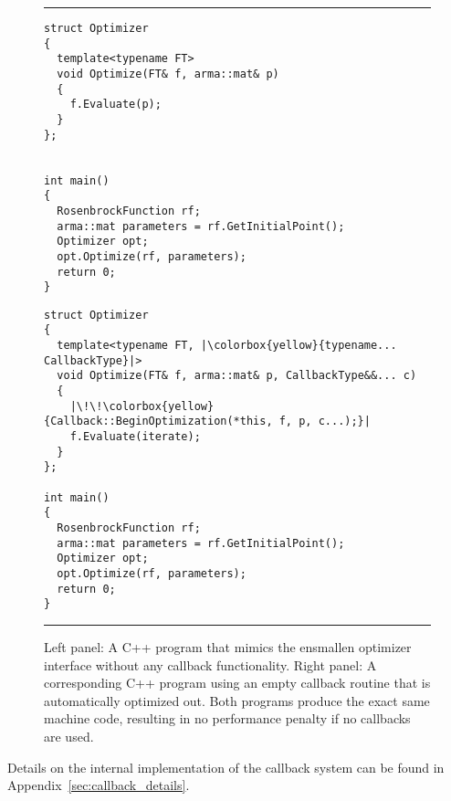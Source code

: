 \begin{figure}[t!]
\centering
\hrule
\vspace{1ex}
\begin{minipage}{0.47\textwidth}
\begin{verbatim}
struct Optimizer
{
  template<typename FT>
  void Optimize(FT& f, arma::mat& p)
  {
    f.Evaluate(p);
  }
};


int main()
{
  RosenbrockFunction rf;
  arma::mat parameters = rf.GetInitialPoint();
  Optimizer opt;
  opt.Optimize(rf, parameters);
  return 0;
}

\end{verbatim}
\end{minipage}
%
\hfill
\vline
\hfill
%
\begin{minipage}{0.51\textwidth}
\begin{verbatim}
struct Optimizer
{
  template<typename FT, |\colorbox{yellow}{typename... CallbackType}|>
  void Optimize(FT& f, arma::mat& p, CallbackType&&... c)
  {
    |\!\!\colorbox{yellow}{Callback::BeginOptimization(*this, f, p, c...);}|
    f.Evaluate(iterate);
  }
};

int main()
{
  RosenbrockFunction rf;
  arma::mat parameters = rf.GetInitialPoint();
  Optimizer opt;
  opt.Optimize(rf, parameters);
  return 0;
}
\end{verbatim}
\end{minipage}
\vspace{1ex}
\hrule
\caption
  {
  Left panel: A C++ program that mimics the ensmallen optimizer interface
  without any callback functionality. Right panel: A corresponding C++ program
  using an empty callback routine that is automatically optimized out. Both
  programs produce the exact same machine code, resulting in no performance
  penalty if no callbacks are used.
  }
\label{fig:callback_compilter_opt}
\end{figure}

Details on the internal implementation of the callback system can be found in
Appendix~\ref{sec:callback_details}.
